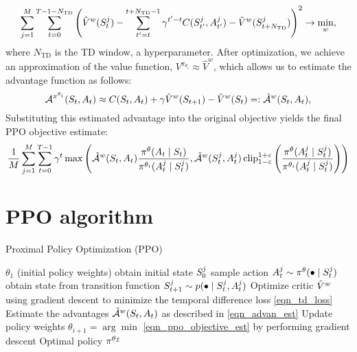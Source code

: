 \documentclass[12pt,twoside]{../../mitthesis}
\begin{document}
\begin{equation}
    \label{eqn_td_loss}
    \sum_{j=1}^M\sum_{t=0}^{T-1 - N_{\text{TD}}}\left(\hat{V}^w(S_t^j) - \sum_{t'=t}^{t + N_{\text{TD}} - 1} \gamma^{t'-t}C(S_{t'}^j, A_{t'}^j) - \hat{V}^w(S_{t + N_{\text{TD}}}^j)\right)^2 \rightarrow \min_{w},
\end{equation}
where $N_{\text{TD}}$ is the TD window, a hyperparameter.
After optimization, we achieve an approximation of the value function, $V^{\pi_{\theta_i}} \approx \hat{V}^w$, which allows us to estimate the advantage function as follows: 
\begin{equation}
    \label{eqn_advan_est}
    \mathcal A^{\pi^{\theta_i}}(S_t, A_t) \approx C(S_t, A_t) + \gamma \hat{V}^w(S_{t+1}) - \hat{V}^w(S_t) =: \hat{\mathcal A}^{w}(S_t, A_t) ,
\end{equation}
Substituting this estimated advantage into the original objective yields the final PPO objective estimate:
\begin{equation}
    \label{eqn_ppo_objective_est}
    \frac{1}{M} \sum_{j = 1}^M \sum_{t=0}^{T-1} \gamma ^ t \max\left(\hat{\mathcal A}^{w}(S_t, A_t)   \frac{\pi^{\theta}(A_t \mid S_t)}{\pi^{\theta_i}(A_t^j \mid S_t^j)}, \hat{\mathcal A}^{w}(S_t^j, A_t^j) \operatorname{clip}_{1 - \varepsilon}^{1 + \varepsilon}\left(\frac{\pi^{\theta}(A_t^j \mid S_t^j)}{\pi^{\theta_i}(A_t^j \mid S_t^j)}\right) \right)
\end{equation}

\section*{PPO algorithm}
\begin{algorithm}
    \caption{Proximal Policy Optimization (PPO)}
    \label{alg:my-alg}
    \begin{algorithmic}
     $\theta_1$ (initial policy weights)
            \STATE obtain initial state $S_0^{j}$
                \STATE sample action $A_t^j \sim \pi^{\theta}(\bullet \mid S_t^{j})$
                \STATE obtain state from transition function $S_{t+1}^j \sim p(\bullet \mid S_t^j, A_t^j)$
            \ENDFOR
        \ENDFOR
        \STATE Optimize critic $\hat{V}^{w}$ using gradient descent to minimize the temporal difference loss \eqref{eqn_td_loss}
        \STATE Estimate the advantages $\hat{\mathcal A}^{w}(S_t, A_t)$ as described in \eqref{eqn_advan_est} 
        \STATE Update policy weights $\theta_{i + 1} = \arg\min$ \eqref{eqn_ppo_objective_est} by performing gradient descent 
    \ENDFOR
    \STATE \RETURN Optimal policy $\pi^{\theta_{\mathcal I}}$
    \end{algorithmic}
\end{algorithm}
\end{document}
